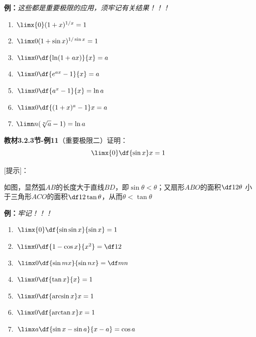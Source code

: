 {\b{\bf 例：}{\it 这些都是重要极限的应用，须牢记有关结果！！！}
\begin{enumerate}[(1)]
  \setlength{\itemindent}{1cm}
  \item $\limx{0}(1+x)^{1/x}=1$ 
  \item $\limx 0(1+\sin x)^{1/\sin x}=1$ 
  \item $\limx 0\df{\ln(1+ax)}{x}=a$
  \item $\limx 0\df{e^{ax}-1}{x}=a$ 
  \item $\limx 0\df{a^x-1}{x}=\ln a$ 
  \item $\limx 0\df{(1+x)^a-1}x=a$
  \item $\limn n(\sqrt[n]{a}-1)=\ln a$ 
\end{enumerate}}

{\bf 教材3.2.3节-例11}（重要极限二）证明：
$$\limx{0}\df {\sin x}x=1$$

{[提示]}：
\begin{center}
\end{center}

如图，显然弧$AB$的长度大于直线$BD$，即$\sin\theta<\theta$；又扇形$ABO$的面积$\df12\theta$
小于三角形$ACO$的面积$\df12\tan\theta$，从而$\theta<\tan\theta$

{\b{\bf 例：}{\it 牢记！！！}
\begin{enumerate}[(1)]
  \setlength{\itemindent}{1cm}
  \item $\limx{0}\df{\sin\sin x}{\sin x}=1$ 
  \item $\limx 0\df{1-\cos x}{x^2}=\df12$ 
  \item $\limx 0\df{\sin mx}{\sin nx}=\df mn$
  \item $\limx 0\df{\tan x}{x}=1$
  \item $\limx 0\df{\arcsin x}x=1$
  \item $\limx 0\df{\arctan x}x=1$
  \item $\limx a\df{\sin x-\sin a}{x-a}=\cos a$
\end{enumerate}}

